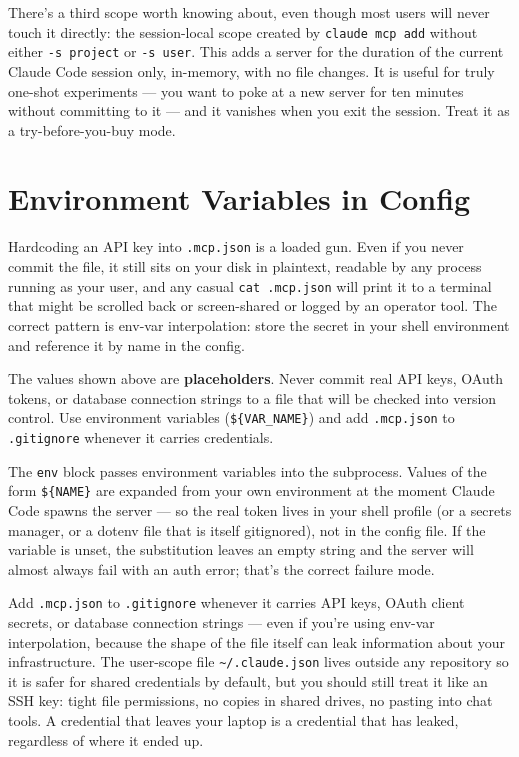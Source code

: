 \documentclass[11pt,letterpaper,openany]{book}
\newcommand{\credentialwarning}{%
\begin{gsdwarning}[Credential Safety]
The values shown above are \textbf{placeholders}. Never commit real API keys,
OAuth tokens, or database connection strings to a file that will be checked
into version control. Use environment variables (\texttt{\$\{VAR\_NAME\}}) and
add \texttt{.mcp.json} to \texttt{.gitignore} whenever it carries credentials.
\end{gsdwarning}%
}
\begin{document}
There's a third scope worth knowing about, even though most users
will never touch it directly: the session-local scope created by
\texttt{claude mcp add} without either \texttt{-s project} or
\texttt{-s user}. This adds a server for the duration of the current
Claude Code session only, in-memory, with no file changes. It is
useful for truly one-shot experiments --- you want to poke at a new
server for ten minutes without committing to it --- and it vanishes
when you exit the session. Treat it as a try-before-you-buy mode.

\section{Environment Variables in Config}

Hardcoding an API key into \texttt{.mcp.json} is a loaded gun. Even if
you never commit the file, it still sits on your disk in plaintext,
readable by any process running as your user, and any casual
\texttt{cat .mcp.json} will print it to a terminal that might be
scrolled back or screen-shared or logged by an operator tool. The
correct pattern is env-var interpolation: store the secret in your
shell environment and reference it by name in the config.


\credentialwarning

The \texttt{env} block passes environment variables into the subprocess.
Values of the form \texttt{\$\{NAME\}} are expanded from your own
environment at the moment Claude Code spawns the server --- so the real
token lives in your shell profile (or a secrets manager, or a dotenv
file that is itself gitignored), not in the config file. If the variable
is unset, the substitution leaves an empty string and the server will
almost always fail with an auth error; that's the correct failure mode.

\begin{gsdimportant}
Add \texttt{.mcp.json} to \texttt{.gitignore} whenever it carries API
keys, OAuth client secrets, or database connection strings --- even if
you're using env-var interpolation, because the shape of the file
itself can leak information about your infrastructure. The user-scope
file \texttt{\~{}/.claude.json} lives outside any repository so it is
safer for shared credentials by default, but you should still treat it
like an SSH key: tight file permissions, no copies in shared drives,
no pasting into chat tools. A credential that leaves your laptop is a
credential that has leaked, regardless of where it ended up.
\end{gsdimportant}
\end{document}
